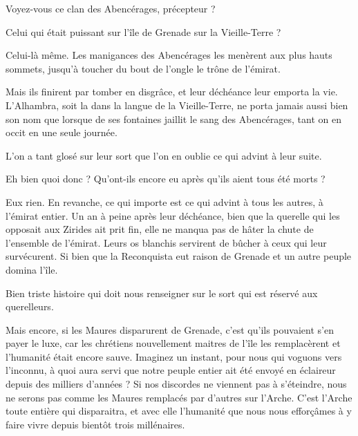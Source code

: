 \begin{drama}

  \elenaspeaks Voyez-vous ce clan des Abencérages, précepteur ?

  \alexasspeaks Celui qui était puissant sur l’île de Grenade sur la Vieille-Terre ?

  \elenaspeaks Celui-là même. Les manigances des Abencérages les menèrent aux plus hauts sommets, jusqu’à toucher du bout de l’ongle le trône de l’émirat.

  \alexasspeaks Mais ils finirent par tomber en disgrâce, et leur déchéance leur emporta la vie. L’Alhambra, soit la  dans la langue de la Vieille-Terre, ne porta jamais aussi bien son nom que lorsque de ses fontaines jaillit le sang des Abencérages, tant on en occit en une seule journée.

  \elenaspeaks L’on a tant glosé sur leur sort que l’on en oublie ce qui advint à leur suite.

  \alexasspeaks Eh bien quoi donc ? Qu’ont-ils encore eu après qu’ils aient tous été morts ?

  \elenaspeaks Eux rien. En revanche, ce qui importe est ce qui advint à tous les autres, à l’émirat entier. Un an à peine après leur déchéance, bien que la querelle qui les opposait aux Zirides ait prit fin, elle ne manqua pas de hâter la chute de l’ensemble de l’émirat. Leurs os blanchis servirent de bûcher à ceux qui leur survécurent. Si bien que la Reconquista eut raison de Grenade et un autre peuple domina l’île.

  \alexasspeaks Bien triste histoire qui doit nous renseigner sur le sort qui est réservé aux querelleurs.

  \elenaspeaks Mais encore, si les Maures disparurent de Grenade, c’est qu’ils pouvaient s’en payer le luxe, car les chrétiens nouvellement maitres de l’île les remplacèrent et l’humanité était encore sauve. Imaginez un instant, pour nous qui voguons vers l’inconnu, à quoi aura servi que notre peuple entier ait été envoyé en éclaireur depuis des milliers d’années ? Si nos discordes ne viennent pas à s’éteindre, nous ne serons pas comme les Maures remplacés par d’autres sur l’Arche. C’est l’Arche toute entière qui disparaitra, et avec elle l’humanité que nous nous efforçâmes à y faire vivre depuis bientôt trois millénaires.



\end{drama}
